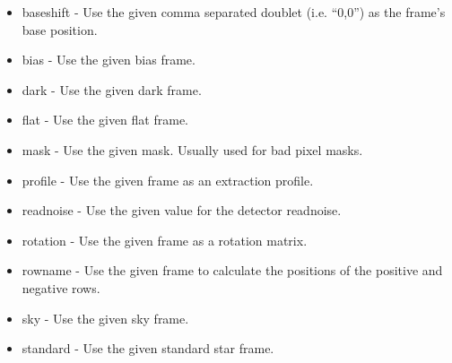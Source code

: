 \documentclass[twoside,11pt]{article}
\renewcommand{\_}{\texttt{\symbol{95}}}
\begin{document}
\begin{itemize}

\item baseshift - Use the given comma separated doublet (i.e. ``0,0'') as the
frame's base position.

\item bias - Use the given bias frame.

\item dark - Use the given dark frame.

\item flat - Use the given flat frame.

\item mask - Use the given mask. Usually used for bad pixel masks.

\item profile - Use the given frame as an extraction profile.

\item readnoise - Use the given value for the detector readnoise.

\item rotation - Use the given frame as a rotation matrix.

\item rowname - Use the given frame to calculate the positions of the positive
and negative rows.

\item sky - Use the given sky frame.

\item standard - Use the given standard star frame.

\end{itemize}

\end{document}

